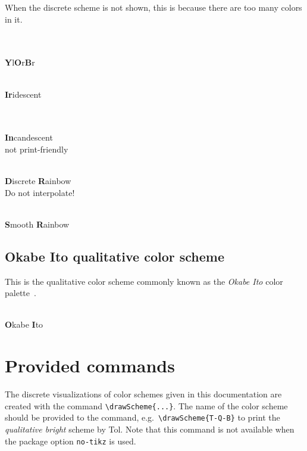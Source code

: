 \documentclass{scrartcl}
\newcommand\marg[1]{\leavevmode\marginpar{\raggedleft #1}}
\begin{document}
When the discrete scheme is not shown, this is because there are too many colors in it.

\begin{center}
    \\
    \\
    \textbf{Y}l\textbf{O}r\textbf{B}r
\end{center}

\begin{center}
    \\
    \textbf{Ir}idescent
\end{center}

\begin{center}
    \\
    \\
    \textbf{In}candescent\\
    not print-friendly
\end{center}

\begin{center}
    \\
    \textbf{D}iscrete \textbf{R}ainbow\\
    Do not interpolate!
\end{center}

\begin{center}
    \\
    \textbf{S}mooth \textbf{R}ainbow\\
\end{center}\clearpage

\subsection{Okabe Ito qualitative color scheme}\label{sec:OkabeIto}
This is the qualitative color scheme commonly known as the \emph{Okabe Ito} color palette~\cite{Ichihara_2008}.

\begin{center}
    \\
    \textbf{O}kabe \textbf{I}to
\end{center}

\section{Provided commands}
\cprotect\marg{\verb!\drawScheme{...}!}%
The discrete visualizations of color schemes given in this documentation are created with the command \verb!\drawScheme{...}!.
The name of the color scheme should be provided to the command, e.g.\ \verb!\drawScheme{T-Q-B}! to print the \emph{qualitative bright} scheme by Tol.
Note that this command is not available when the package option \verb!no-tikz! is used.
\end{document}
